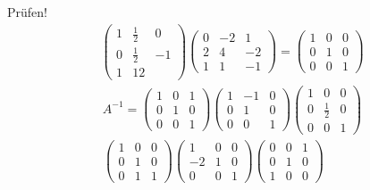 \documentclass[11pt]{report}
\begin{document}
Prüfen!
\begin{align}
\begin{pmatrix} 1 & \frac{1}{2} & 0 \\ 0 & \frac{1}{2} & -1 \\ 1 & 1 2 \end{pmatrix} \begin{pmatrix} 0 & -2 & 1 \\ 2 & 4 & -2 \\ 1 & 1 & -1\end{pmatrix} = \begin{pmatrix} 1 & 0 & 0 \\ 0 & 1 & 0 \\ 0 & 0 & 1\end{pmatrix}
\end{align}
\begin{align}
A^{-1} = \begin{pmatrix} 1 & 0 & 1 \\ 0 & 1 & 0 \\ 0 & 0 & 1\end{pmatrix} \begin{pmatrix} 1 & -1 & 0 \\ 0 & 1 & 0 \\ 0 & 0 & 1\end{pmatrix} \begin{pmatrix} 1 & 0 & 0 \\ 0 & \frac{1}{2} & 0 \\ 0 & 0 & 1\end{pmatrix} \\ \begin{pmatrix} 1 & 0 & 0 \\ 0 & 1 & 0 \\ 0 & 1 & 1\end{pmatrix} \begin{pmatrix} 1 & 0 & 0 \\ -2 & 1 & 0 \\ 0 & 0 & 1\end{pmatrix} \begin{pmatrix} 0 & 0 & 1 \\ 0 & 1 & 0 \\ 1 & 0 & 0\end{pmatrix}
\end{align}
\end{document}
